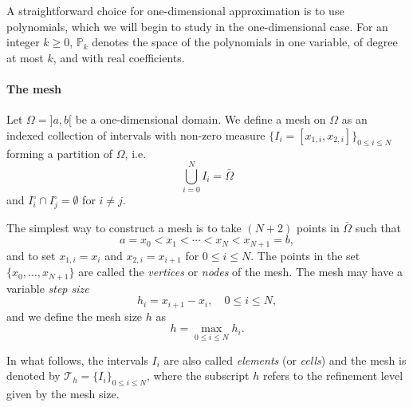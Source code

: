 A straightforward choice for one-dimensional approximation is to use polynomials, which we will begin to study in the one-dimensional case. For an integer $k \ge 0$, $\mathbb{P}_k$ denotes the space of the polynomials in one variable, of degree at most $k$, and with real coefficients.

\paragraph{The mesh}
\begin{definition}[Mesh]\label{def:mesh}
    Let $\Omega = ]a, b[$ be a one-dimensional domain. We define a mesh on $\Omega$ as an indexed collection of intervals with non-zero measure $\{I_i = [x_{1,i}, x_{2,i}]\}_{0 \leq i \leq N}$ forming a partition of $\Omega$, i.e.
    \begin{equation}\label{eq:def-mesh}
        \bigcup_{i=0}^N I_i = \bar{\Omega}
    \end{equation}
    and $I_i^\circ \cap I_j^\circ = \emptyset$ for $i \neq j$.
\end{definition}
The simplest way to construct a mesh is to take $(N+2)$ points in $\bar{\Omega}$ such that
\begin{equation}
    a = x_0 < x_1 < \cdots < x_N < x_{N+1} = b,
\end{equation}
and to set $x_{1,i} = x_i$ and $x_{2,i} = x_{i+1}$ for $0 \le i \le N$. The points in the set $\{x_0, \dots, x_{N+1}\}$ are called the \emph{vertices} or \emph{nodes} of the mesh. The mesh may have a variable \emph{step size}
\begin{equation}
    h_i = x_{i+1} - x_i, \quad 0 \leq i \le N,
\end{equation}
and we define the mesh size $h$ as
\begin{equation}
    h = \max_{0 \le i \le N} h_i.
\end{equation}

In what follows, the intervals $I_i$ are also called \emph{elements} (or \emph{cells}) and the mesh is denoted by $\mathcal{T}_h = \{I_i\}_{0 \le i \le N}$, where the subscript $h$ refers to the refinement level given by the mesh size.

